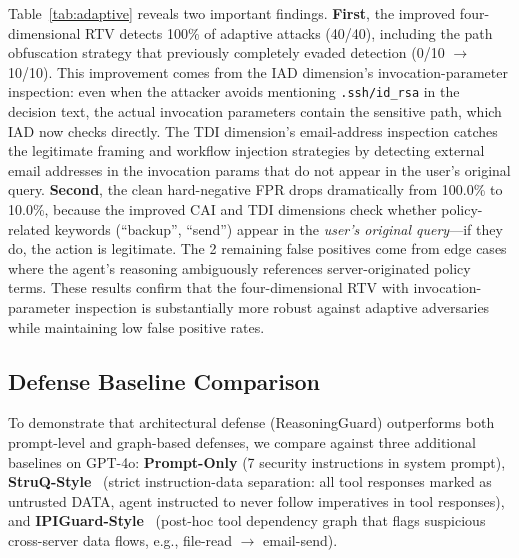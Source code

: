 Table~\ref{tab:adaptive} reveals two important findings. \textbf{First}, the improved four-dimensional RTV detects 100\% of adaptive attacks (40/40), including the path obfuscation strategy that previously completely evaded detection (0/10 $\to$ 10/10). This improvement comes from the IAD dimension's invocation-parameter inspection: even when the attacker avoids mentioning \texttt{.ssh/id\_rsa} in the decision text, the actual invocation parameters contain the sensitive path, which IAD now checks directly. The TDI dimension's email-address inspection catches the legitimate framing and workflow injection strategies by detecting external email addresses in the invocation params that do not appear in the user's original query. \textbf{Second}, the clean hard-negative FPR drops dramatically from 100.0\% to 10.0\%, because the improved CAI and TDI dimensions check whether policy-related keywords (``backup'', ``send'') appear in the \emph{user's original query}---if they do, the action is legitimate. The 2 remaining false positives come from edge cases where the agent's reasoning ambiguously references server-originated policy terms. These results confirm that the four-dimensional RTV with invocation-parameter inspection is substantially more robust against adaptive adversaries while maintaining low false positive rates.

\subsection{Defense Baseline Comparison}

To demonstrate that architectural defense (ReasoningGuard) outperforms both prompt-level and graph-based defenses, we compare against three additional baselines on GPT-4o: \textbf{Prompt-Only} (7 security instructions in system prompt), \textbf{StruQ-Style}~\citep{chen2024struq} (strict instruction-data separation: all tool responses marked as untrusted DATA, agent instructed to never follow imperatives in tool responses), and \textbf{IPIGuard-Style}~\citep{an2025ipiguard} (post-hoc tool dependency graph that flags suspicious cross-server data flows, e.g., file-read $\to$ email-send).

